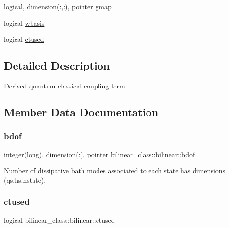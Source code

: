 \begin{DoxyCompactItemize}
logical, dimension(\+:,\+:), pointer \hyperlink{structbilinear__class_1_1bilinear_aeb06e78f97c5cdac0c83422ec087e2e0}{gmap}
\item 
logical \hyperlink{structbilinear__class_1_1bilinear_a78eec2ff8a3e1de38eb02ceeb108ad15}{wbasis}
\item 
logical \hyperlink{structbilinear__class_1_1bilinear_aba7556e23595f003ffcf20327dc18f3e}{ctused}
\end{DoxyCompactItemize}


\subsection{Detailed Description}
Derived quantum-\/classical coupling term. 

\subsection{Member Data Documentation}
\mbox{\label{structbilinear__class_1_1bilinear_a78e65d82cd358d5dfa19b780ab877fa0}} 
\subsubsection{\texorpdfstring{bdof}{bdof}}
{\footnotesize\ttfamily integer(long), dimension(\+:), pointer bilinear\+\_\+class\+::bilinear\+::bdof\hspace{0.3cm}{\ttfamily [private]}}



Number of dissipative bath modes associated to each state has dimensions (qs.\+hs.\+nstate). 

\mbox{\label{structbilinear__class_1_1bilinear_aba7556e23595f003ffcf20327dc18f3e}} 
\subsubsection{\texorpdfstring{ctused}{ctused}}
{\footnotesize\ttfamily logical bilinear\+\_\+class\+::bilinear\+::ctused\hspace{0.3cm}{\ttfamily [private]}}

